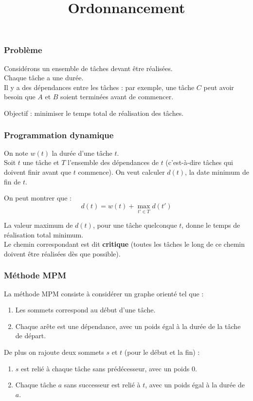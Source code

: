 \documentclass[draft]{beamer}
\begin{document}
\title{Ordonnancement}

\begin{frame}
    \titlepage
\end{frame}

\begin{frame}[fragile]
    \frametitle{Problème}
    Considérons un ensemble de tâches devant être réalisées.\\
    Chaque tâche a une durée.\\
    Il y a des dépendances entre les tâches : par exemple, une tâche $C$ peut avoir besoin que $A$ et $B$ soient terminées avant de commencer.
    \vspace{2\baselineskip}
    \pause

    Objectif : minimiser le temps total de réalisation des tâches.
\end{frame}

\begin{frame}
    \frametitle{Programmation dynamique}
    On note $w(t)$ la durée d'une tâche $t$.\\
    Soit $t$ une tâche et $T$ l'ensemble des dépendances de $t$ (c'est-à-dire tâches qui doivent finir avant que $t$ commence).
    On veut calculer $d(t)$, la date minimum de fin de $t$.
    \pause
    \vspace{\baselineskip}

    On peut montrer que :
    $$\boxed{d(t) = w(t) + \max_{t' \in T} d(t')}$$
    \pause
    \vspace{\baselineskip}

    La valeur maximum de $d(t)$, pour une tâche quelconque $t$, donne le temps de réalisation total minimum.\\
    Le chemin correspondant est dit \textbf{critique} (toutes les tâches le long de ce chemin doivent être réalisées dès que possible).
\end{frame}

\begin{frame}[fragile]
    \frametitle{Méthode MPM}
    La méthode MPM consiste à considérer un graphe orienté tel que :
    \begin{enumerate}
        \item Les sommets correspond au début d'une tâche.
        \item Chaque arête est une dépendance, avec un poids égal à la durée de la tâche de départ.
    \end{enumerate}
    \pause
    \vspace{\baselineskip}

    De plus on rajoute deux sommets $s$ et $t$ (pour le début et la fin) :
    \begin{enumerate}
        \item $s$ est relié à chaque tâche sans prédécesseur, avec un poids 0.
        \item Chaque tâche $a$ sans successeur est relié à $t$, avec un poids égal à la durée de $a$.
    \end{enumerate}
\end{frame}
\end{document}
